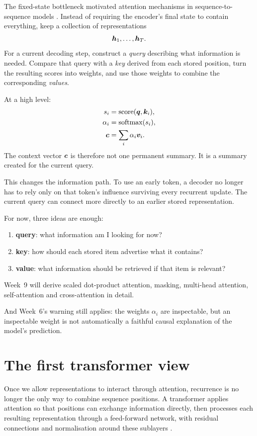 The fixed-state bottleneck motivated attention mechanisms in sequence-to-sequence models \parencite{bahdanau2015}. Instead of requiring the encoder's final state to contain everything, keep a collection of representations
\[
  \bm{h}_1,\ldots,\bm{h}_T.
\]
For a current decoding step, construct a \emph{query} describing what information is needed. Compare that query with a \emph{key} derived from each stored position, turn the resulting scores into weights, and use those weights to combine the corresponding \emph{values}.

At a high level:
\[
\begin{aligned}
  s_i &= \mathrm{score}(\bm{q},\bm{k}_i),\\
  \alpha_i &= \mathrm{softmax}(s_i),\\
  \bm{c} &= \sum_i \alpha_i\bm{v}_i.
\end{aligned}
\]
The context vector \(\bm{c}\) is therefore not one permanent summary. It is a summary created for the current query.

This changes the information path. To use an early token, a decoder no longer has to rely only on that token's influence surviving every recurrent update. The current query can connect more directly to an earlier stored representation.

For now, three ideas are enough:
\begin{enumerate}[leftmargin=*]
  \item \textbf{query}: what information am I looking for now?
  \item \textbf{key}: how should each stored item advertise what it contains?
  \item \textbf{value}: what information should be retrieved if that item is relevant?
\end{enumerate}

Week~9 will derive scaled dot-product attention, masking, multi-head attention, self-attention and cross-attention in detail.

And Week~6's warning still applies: the weights \(\alpha_i\) are inspectable, but an inspectable weight is not automatically a faithful causal explanation of the model's prediction.

\section{The first transformer view}

Once we allow representations to interact through attention, recurrence is no longer the only way to combine sequence positions. A transformer applies attention so that positions can exchange information directly, then processes each resulting representation through a feed-forward network, with residual connections and normalisation around these sublayers \parencite{vaswani2017}.

